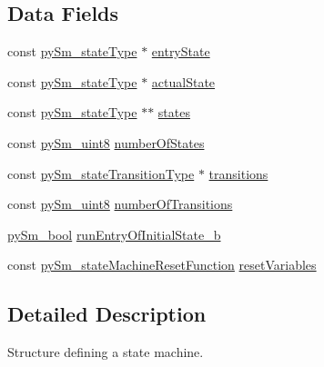 \subsection*{Data Fields}
\begin{DoxyCompactItemize}
\item 
const \hyperlink{structpySm__stateType}{py\+Sm\+\_\+state\+Type} $\ast$ \hyperlink{structpySm__stateMachineType_ac9896d220e5e80df257943742f47f6d0}{entry\+State}
\item 
const \hyperlink{structpySm__stateType}{py\+Sm\+\_\+state\+Type} $\ast$ \hyperlink{structpySm__stateMachineType_ae27c47a325a7b6d1caa4d67621e48fae}{actual\+State}
\item 
const \hyperlink{structpySm__stateType}{py\+Sm\+\_\+state\+Type} $\ast$$\ast$ \hyperlink{structpySm__stateMachineType_a6b964357abaeecf851825d1203a59582}{states}
\item 
const \hyperlink{PySm__types_8h_a1aff40256c00f194609879f8f6f1e1a1}{py\+Sm\+\_\+uint8} \hyperlink{structpySm__stateMachineType_a8df1d19072975480da4985f99f8ae19e}{number\+Of\+States}
\item 
const \hyperlink{structpySm__stateTransitionType}{py\+Sm\+\_\+state\+Transition\+Type} $\ast$ \hyperlink{structpySm__stateMachineType_a3f35562e1b353b47e2a90a957882a610}{transitions}
\item 
const \hyperlink{PySm__types_8h_a1aff40256c00f194609879f8f6f1e1a1}{py\+Sm\+\_\+uint8} \hyperlink{structpySm__stateMachineType_a3d4035a87cce41845ae138aa2a279e20}{number\+Of\+Transitions}
\item 
\hyperlink{PySm__types_8h_a368133d64634d66410f3fe1343de6ba3}{py\+Sm\+\_\+bool} \hyperlink{structpySm__stateMachineType_a3320131411f6304cba856edbcfedd060}{run\+Entry\+Of\+Initial\+State\+\_\+b}
\item 
const \hyperlink{PySm_8h_acf18fbe39f8464bd70f03199165ef4a2}{py\+Sm\+\_\+state\+Machine\+Reset\+Function} \hyperlink{structpySm__stateMachineType_a37e20b01fecc6d91d5625b0cd10dcfaa}{reset\+Variables}
\end{DoxyCompactItemize}


\subsection{Detailed Description}
Structure defining a state machine. 

